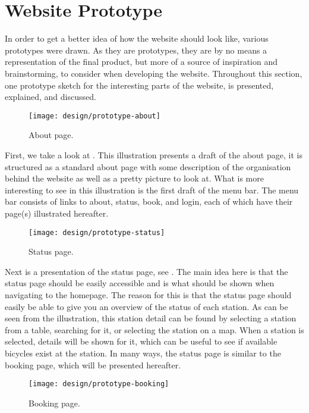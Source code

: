 \section{Website Prototype}
In order to get a better idea of how the website should look like, various prototypes were drawn.
As they are prototypes, they are by no means a representation of the final product, but more of a source of inspiration and brainstorming, to consider when developing the website.
Throughout this section, one prototype sketch for the interesting parts of the website, is presented, explained, and discussed.

\begin{figure}[h]
	\centering
	\texttt{[image: design/prototype-about]}
	\caption{About page.}\label{fig:prototype-about}
\end{figure}

First, we take a look at .
This illustration presents a draft of the about page, it is structured as a standard about page with some description of the organisation behind the website as well as a pretty picture to look at.
What is more interesting to see in this illustration is the first draft of the menu bar.
The menu bar consists of links to about, status, book, and login, each of which have their page(s) illustrated hereafter.

\begin{figure}[h]
	\centering
	\texttt{[image: design/prototype-status]}
	\caption{Status page.}\label{fig:prototype-status}
\end{figure}

Next is a presentation of the status page, see .
The main idea here is that the status page should be easily accessible and is what should be shown when navigating to the homepage.
The reason for this is that the status page should easily be able to give you an overview of the status of each station.
As can be seen from the illustration, this station detail can be found by selecting a station from a table, searching for it, or selecting the station on a map.
When a station is selected, details will be shown for it, which can be useful to see if available bicycles exist at the station.
In many ways, the status page is similar to the booking page, which will be presented hereafter.

\begin{figure}[h]
	\centering
	\texttt{[image: design/prototype-booking]}
	\caption{Booking page.}\label{fig:prototype-book}
\end{figure}

